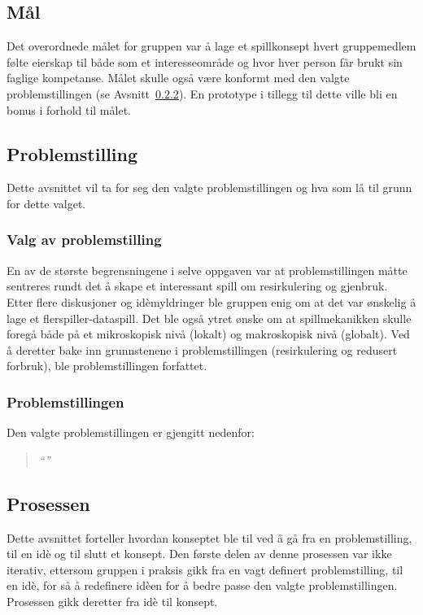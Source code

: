 \subsection{Mål}
Det overordnede målet for gruppen var å lage et spillkonsept hvert
gruppemedlem følte eierskap til både som et interesseområde og hvor hver person får brukt sin faglige kompetanse. Målet skulle også være konformt med den valgte
problemstillingen (se Avsnitt~\ref{sec:problemstilling}). En prototype i
tillegg til dette ville bli en bonus i forhold til målet.

\subsection{Problemstilling}
Dette avsnittet vil ta for seg den valgte problemstillingen og hva som
lå til grunn for dette valget.
\subsubsection{Valg av problemstilling}
En av de største begrensningene i selve oppgaven var at
problemstillingen måtte sentreres rundt det å skape et interessant spill
om resirkulering og gjenbruk. Etter flere diskusjoner og idèmyldringer ble gruppen
enig om at det var ønskelig å lage et flerspiller-dataspill.
Det ble også ytret ønske om at spillmekanikken skulle foregå både på et
mikroskopisk nivå (lokalt) og makroskopisk nivå (globalt). Ved å
deretter bake inn grunnstenene i problemstillingen (resirkulering og
redusert forbruk), ble problemstillingen forfattet.
\subsubsection{Problemstillingen}\label{sec:problemstilling}
Den valgte problemstillingen er gjengitt nedenfor:
\begin{quotation}
\large\emph{``''}
\end{quotation}
\subsection{Prosessen}
Dette avsnittet forteller hvordan konseptet ble til ved å gå fra en
problemstilling, til en idè og til slutt et konsept. Den første delen av
denne prosessen var ikke iterativ, ettersom gruppen i praksis gikk fra
en vagt definert problemstilling, til en idè, for så å redefinere idèen
for å bedre passe den valgte problemstillingen. Prosessen gikk deretter
fra idè til konsept. 
